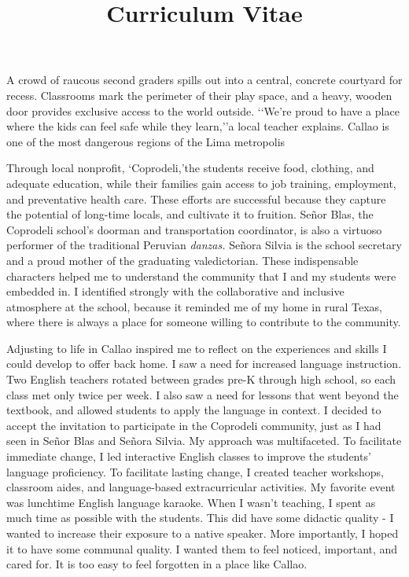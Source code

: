 \documentclass[12pt,a4paper,roman]{moderncv} %
\title{Curriculum Vitae}
\begin{document}


\clearpage


A crowd of raucous second graders spills out into a central, concrete courtyard for recess. Classrooms mark the perimeter of their play space, and a heavy, wooden door provides exclusive access to the world outside. \lq\lq We're proud to have a place where the kids can feel safe while they learn,\rq\rq\space a local teacher explains. Callao is one of the most dangerous regions of the Lima metropolis

\medskip
 
Through local nonprofit, \lq Coprodeli,\rq\space the students receive food, clothing, and adequate education, while their families gain access to job training, employment, and preventative health care. These efforts are successful because they capture the potential of long-time locals, and cultivate it to fruition. Se\~nor Blas, the Coprodeli school's doorman and transportation coordinator, is also a virtuoso performer of the traditional Peruvian \textit{danzas.} Se\~nora Silvia is the school secretary and a proud mother of the graduating valedictorian. These indispensable characters helped me to understand the community that I and my students were embedded in. I identified strongly with the collaborative and inclusive atmosphere at the school, because it reminded me of my home in rural Texas, where there is always a place for someone willing to contribute to the community.

\medskip

Adjusting to life in Callao inspired me to reflect on the experiences and skills I could develop to offer back home. I saw a need for increased language instruction. Two English teachers rotated between grades pre-K through high school, so each class met only twice per week. I also saw a need for lessons that went beyond the textbook, and allowed students to apply the language in context. I decided to accept the invitation to participate in the Coprodeli community, just as I had seen in Se\~nor Blas and Se\~nora Silvia.  My approach was multifaceted. To facilitate immediate change, I led interactive English classes to improve the students' language proficiency. To facilitate lasting change, I created teacher workshops, classroom aides, and language-based extracurricular activities. My favorite event was lunchtime English language karaoke. When I wasn't teaching, I spent as much time as possible with the students. This did have some didactic quality - I wanted to increase their exposure to a native speaker. More importantly, I hoped it to have some communal quality. I wanted them to feel noticed, important, and cared for. It is too easy to feel forgotten in a place like Callao.
\end{document}
